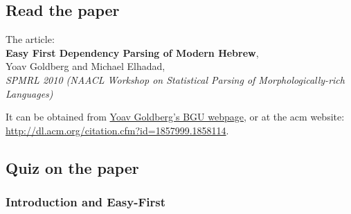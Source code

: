 \documentclass[11pt]{article}
\begin{document}
  
\subsection{Read the paper}
\label{sec-7-1}


The article: \\
\textbf{Easy First Dependency Parsing of Modern Hebrew}, \\
   Yoav Goldberg and Michael Elhadad, \\
   \emph{SPMRL 2010 (NAACL Workshop on Statistical Parsing of    Morphologically-rich Languages)}


It can be obtained from \href{http://www.cs.bgu.ac.il/~yoavg/publications/naacl2010dep.pdf}{Yoav Goldberg's BGU webpage}, or at the acm
website: 
\href{http://dl.acm.org/citation.cfm?id=1857999.1858114}{http://dl.acm.org/citation.cfm?id=1857999.1858114}.


   
\subsection{Quiz on the paper}
\label{sec-7-2}
\subsubsection{Introduction and Easy-First}
\label{sec-7-2-1}
\end{document}
